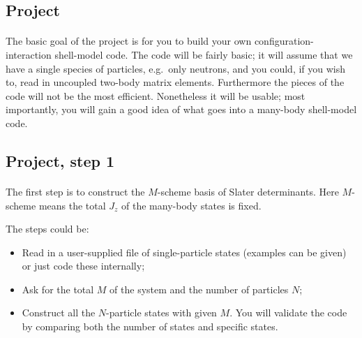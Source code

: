 \documentclass[%
twoside,                 %
final,                   %
10pt]{article}
\begin{document}
\noindent



\subsection{Project}

\paragraph{}
The basic goal of the project is for you to build your own configuration-interaction  shell-model 
code. The code will be fairly basic; it will assume that we have 
a single species of particles, e.g.~only neutrons, 
and you could, if you wish to,  read in uncoupled two-body matrix elements.  Furthermore the pieces of the code will not 
be the most efficient.  Nonetheless it will be usable; most importantly, you will gain a good idea of what goes into a many-body shell-model code.





\subsection{Project, step 1}

\paragraph{}

The first step  is to construct the $M$-scheme basis of Slater determinants.
Here $M$-scheme means the total $J_z$ of the many-body states is fixed.

The steps could be:

\begin{itemize}
\item Read in a user-supplied file of single-particle states (examples can be given) or just code these internally;

\item Ask for the total $M$ of the system and the number of particles $N$;

\item Construct all the $N$-particle states with given $M$.  You will validate the code by  comparing both the number of states and specific states.
\end{itemize}
\end{document}
